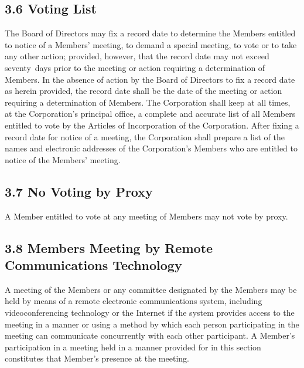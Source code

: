 \documentclass[
]{book}
\begin{document}
\subsection*{3.6 Voting List}\label{voting-list}

The Board of Directors may fix a record date to determine the Members entitled to notice of a Members' meeting, to demand a special meeting, to vote or to take any other action; provided, however, that the record date may not exceed seventy~days prior to the meeting or action requiring a determination of Members. In the absence of action by the Board of Directors to fix a record date as herein provided, the record date shall be the date of the meeting or action requiring a determination of Members. The Corporation shall keep at all times, at the Corporation's principal office, a complete and accurate list of all Members entitled to vote by the Articles of Incorporation of the Corporation. After fixing a record date for notice of a meeting, the Corporation shall prepare a list of the names and electronic addresses of the Corporation's Members who are entitled to notice of the Members' meeting.

\subsection*{3.7 No Voting by Proxy}\label{no-voting-by-proxy}

A Member entitled to vote at any meeting of Members may not vote by
proxy.

\subsection*{3.8 Members Meeting by Remote Communications Technology}\label{members-meeting-by-remote-communications-technology}

A meeting of the Members or any committee designated by the Members may be held by means of a remote electronic communications system, including videoconferencing technology or the Internet if the system provides access to the meeting in a manner or using a method by which each person participating in the meeting can communicate concurrently with each other participant. A Member's participation in a meeting held in a manner provided for in this section constitutes that Member's presence at the meeting.
\end{document}
